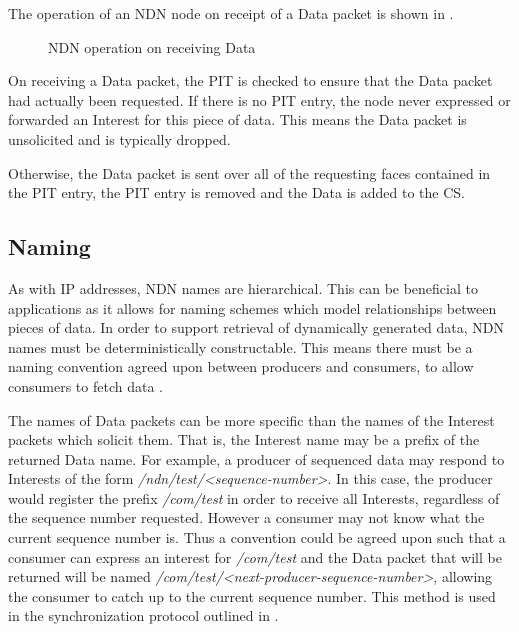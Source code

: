 The operation of an NDN node on receipt of a Data packet is shown in .
\begin{figure}[H]
    \centering
    \caption{NDN operation on receiving Data}
    \label{fig:ndn-on-data}
\end{figure}


On receiving a Data packet, the PIT is checked to ensure that the Data packet had actually been requested. If there is no PIT entry, the node never expressed or forwarded an Interest for this piece of data. This means the Data packet is unsolicited and is typically dropped.

Otherwise, the Data packet is sent over all of the requesting faces contained in the PIT entry, the PIT entry is removed and the Data is added to the CS.











\subsection{Naming}\label{sec:ndn-names}
As with IP addresses, NDN names are hierarchical. This can be beneficial to applications as it allows for naming schemes which model relationships between pieces of data. In order to support retrieval of dynamically generated data, NDN names must be deterministically constructable. This means there must be a naming convention agreed upon between producers and consumers, to allow consumers to fetch data \cite{ndn-project}. 

The names of Data packets can be more specific than the names of the Interest packets which solicit them. That is, the Interest name may be a prefix of the returned Data name. For example, a producer of sequenced data may respond to Interests of the form \textit{/ndn/test/<sequence-number>}.  In this case, the producer would register the prefix \textit{/com/test} in order to receive all Interests, regardless of the sequence number requested. However a consumer may not know what the current sequence number is. Thus a convention could be agreed upon such that a consumer can express an interest for \textit{/com/test} and the Data packet that will be returned will be named \textit{/com/test/<next-producer-sequence-number>}, allowing the consumer to catch up to the current sequence number. This method is used in the synchronization protocol outlined in .














